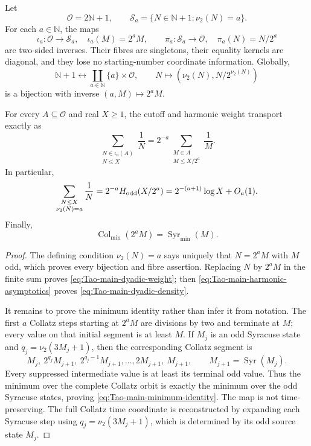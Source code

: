 \begin{proposition}
\label{prop:Tao-main-dyadic-morphism}
Let
\[
 \mathcal O=2\mathbb N+1,
 \qquad
 \mathcal S_a=\{N\in\mathbb N+1:\nu_2(N)=a\}.
\]
For each \(a\in\mathbb N\), the maps
\[
 \iota_a:\mathcal O\longrightarrow\mathcal S_a,
 \quad \iota_a(M)=2^aM,
 \qquad
 \pi_a:\mathcal S_a\longrightarrow\mathcal O,
 \quad \pi_a(N)=N/2^a
\]
are two-sided inverses.  Their fibres are singletons, their equality kernels
are diagonal, and they lose no starting-number coordinate information.
Globally,
\begin{equation}
\label{eq:Tao-main-global-dyadic-bijection}
 \mathbb N+1\longleftrightarrow
 \coprod_{a\in\mathbb N}\{a\}\times\mathcal O,
 \qquad
 N\longmapsto(\nu_2(N),N/2^{\nu_2(N)})
\end{equation}
is a bijection with inverse \((a,M)\mapsto2^aM\).

For every \(A\subseteq\mathcal O\) and real \(X\geq1\), the cutoff and
harmonic weight transport exactly as
\begin{equation}
\label{eq:Tao-main-dyadic-weight}
 \sum_{\substack{N\in\iota_a(A)\\N\leq X}}\frac1N
 =2^{-a}\sum_{\substack{M\in A\\M\leq X/2^a}}\frac1M.
\end{equation}
In particular,
\begin{equation}
\label{eq:Tao-main-dyadic-density}
 \sum_{\substack{N\leq X\\\nu_2(N)=a}}\frac1N
 =2^{-a}H_{\rm odd}(X/2^a)
 =2^{-(a+1)}\log X+O_a(1).
\end{equation}
Finally,
\begin{equation}
\label{eq:Tao-main-minimum-identity}
 \operatorname{Col}_{\min}(2^aM)
 =\operatorname{Syr}_{\min}(M).
\end{equation}
\end{proposition}

\begin{proof}
The defining condition \(\nu_2(N)=a\) says uniquely that \(N=2^aM\)
with \(M\) odd, which proves every bijection and fibre assertion.  Replacing
\(N\) by \(2^aM\) in the finite sum proves
\eqref{eq:Tao-main-dyadic-weight}; then
\eqref{eq:Tao-main-harmonic-asymptotics} proves
\eqref{eq:Tao-main-dyadic-density}.

It remains to prove the minimum identity rather than infer it from notation.
The first \(a\) Collatz steps starting at \(2^aM\) are divisions by two and
terminate at \(M\); every value on that initial segment is at least \(M\).
If \(M_j\) is an odd Syracuse state and
\(q_j=\nu_2(3M_j+1)\), then the corresponding Collatz segment is
\[
 M_j,\ 2^{q_j}M_{j+1},\ 2^{q_j-1}M_{j+1},\ldots,
 2M_{j+1},\ M_{j+1},
 \qquad M_{j+1}=\operatorname{Syr}(M_j).
\]
Every suppressed intermediate value is at least its terminal odd value.
Thus the minimum over the complete Collatz orbit is exactly the minimum over
the odd Syracuse states, proving \eqref{eq:Tao-main-minimum-identity}.
The map is not time-preserving.  The full Collatz time coordinate is
reconstructed by expanding each Syracuse step using
\(q_j=\nu_2(3M_j+1)\), which is determined by its odd source state \(M_j\).
\end{proof}

